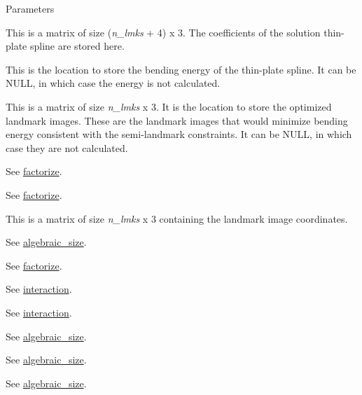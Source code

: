 \begin{DoxyParams}{Parameters}
\item[\mbox{\tt[out]} {\em spline}]This is a matrix of size ({\itshape n\_\-lmks\/} + 4) x 3. The coefficients of the solution thin-\/plate spline are stored here. \item[\mbox{\tt[out]} {\em energy\_\-opt}]This is the location to store the bending energy of the thin-\/plate spline. It can be {\ttfamily NULL}, in which case the energy is not calculated. \item[\mbox{\tt[out]} {\em relax\_\-lmk\_\-images\_\-opt}]This is a matrix of size {\itshape n\_\-lmks\/} x 3. It is the location to store the optimized landmark images. These are the landmark images that would minimize bending energy consistent with the semi-\/landmark constraints. It can be {\ttfamily NULL}, in which case they are not calculated. \item[\mbox{\tt[in]} {\em F}]See \hyperlink{classew_1_1Tps3_abc71d05432b69dcaab46b5a2e2dc5e2a}{factorize}. \item[\mbox{\tt[in]} {\em pivots}]See \hyperlink{classew_1_1Tps3_abc71d05432b69dcaab46b5a2e2dc5e2a}{factorize}. \item[\mbox{\tt[in]} {\em lmk\_\-images}]This is a matrix of size {\itshape n\_\-lmks\/} x 3 containing the landmark image coordinates. \item[\mbox{\tt[in]} {\em relax\_\-dims\_\-opt}]See \hyperlink{classew_1_1Tps3_a11e70148259244e2c975dabd72ceb28c}{algebraic\_\-size}. \item[\mbox{\tt[in]} {\em relax\_\-params\_\-opt}]See \hyperlink{classew_1_1Tps3_abc71d05432b69dcaab46b5a2e2dc5e2a}{factorize}. \item[\mbox{\tt[in]} {\em L}]See \hyperlink{classew_1_1Tps3_add5597fd0edb1437c9694d765c507aff}{interaction}. \item[\mbox{\tt[in]} {\em n\_\-lmks}]See \hyperlink{classew_1_1Tps3_add5597fd0edb1437c9694d765c507aff}{interaction}. \item[\mbox{\tt[in]} {\em f\_\-size}]See \hyperlink{classew_1_1Tps3_a11e70148259244e2c975dabd72ceb28c}{algebraic\_\-size}. \item[\mbox{\tt[in]} {\em is\_\-mixed}]See \hyperlink{classew_1_1Tps3_a11e70148259244e2c975dabd72ceb28c}{algebraic\_\-size}. \item[\mbox{\tt[in]} {\em is\_\-reduced}]See \hyperlink{classew_1_1Tps3_a11e70148259244e2c975dabd72ceb28c}{algebraic\_\-size}. \end{DoxyParams}

